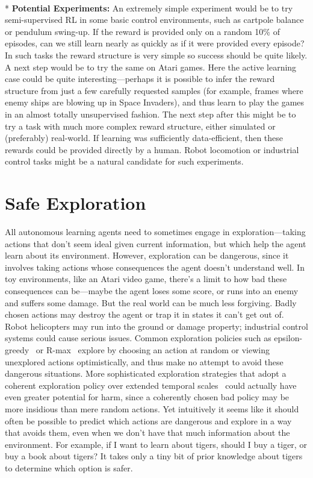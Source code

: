 \documentclass[a4paper,10pt]{article}
\begin{document}
$~$\\* {\bf Potential Experiments:} An extremely simple experiment would be to try semi-supervised RL in some basic control environments, such as cartpole balance or pendulum swing-up.  If the reward is provided only on a random 10\% of episodes, can we still learn nearly as quickly as if it were provided every episode?  In such tasks the reward structure is very simple so success should be quite likely.  A next step would be to try the same on Atari games.  Here the active learning case could be quite interesting---perhaps it is possible to infer the reward structure from just a few carefully requested samples (for example, frames where enemy ships are blowing up in Space Invaders), and thus learn to play the games in an almost totally unsupervised fashion.  The next step after this might be to try a task with much more complex reward structure, either simulated or (preferably) real-world. If learning was sufficiently data-efficient, then these rewards could be provided directly by a human. Robot locomotion or industrial control tasks might be a natural candidate for such experiments.

\section{Safe Exploration} \label{problem:SafeExploration}

All autonomous learning agents need to sometimes engage in exploration---taking actions that don’t seem ideal given current information, but which help the agent learn about its environment.  However, exploration can be dangerous, since it involves taking actions whose consequences the agent doesn’t understand well.  In toy environments, like an Atari video game, there’s a limit to how bad these consequences can be---maybe the agent loses some score, or runs into an enemy and suffers some damage.  But the real world can be much less forgiving.  Badly chosen actions may destroy the agent or trap it in states it can’t get out of.  Robot helicopters may run into the ground or damage property; industrial control systems could cause serious issues.  Common exploration policies such as epsilon-greedy~\cite{sutton1998reinforcement} or R-max~\cite{brafman2003r} explore by choosing an action at random or viewing unexplored actions optimistically, and thus make no attempt to avoid these dangerous situations.  More sophisticated exploration strategies that adopt a coherent exploration policy over extended temporal scales~\cite{osband2016deep} could actually have even greater potential for harm, since a coherently chosen bad policy may be more insidious than mere random actions.  Yet intuitively it seems like it should often be possible to predict which actions are dangerous and explore in a way that avoids them, even when we don’t have that much information about the environment.  For example, if I want to learn about tigers, should I buy a tiger, or buy a book about tigers?  It takes only a tiny bit of prior knowledge about tigers to determine which option is safer.
\end{document}
